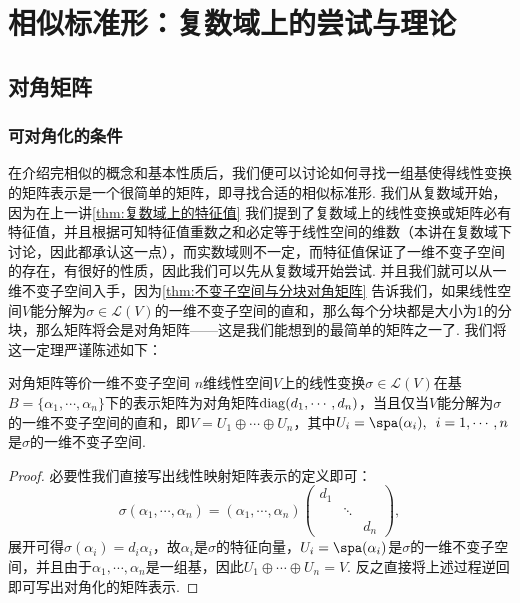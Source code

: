 \chapter{相似标准形：复数域上的尝试与理论}

\section{对角矩阵}
\subsection{可对角化的条件}

在介绍完相似的概念和基本性质后，我们便可以讨论如何寻找一组基使得线性变换的矩阵表示是一个很简单的矩阵，即寻找合适的相似标准形. 我们从复数域开始，因为在上一讲\autoref{thm:复数域上的特征值} 我们提到了复数域上的线性变换或矩阵必有特征值，并且根据可知特征值重数之和必定等于线性空间的维数（本讲在复数域下讨论，因此都承认这一点），而实数域则不一定，而特征值保证了一维不变子空间的存在，有很好的性质，因此我们可以先从复数域开始尝试. 并且我们就可以从一维不变子空间入手，因为\autoref{thm:不变子空间与分块对角矩阵} 告诉我们，如果线性空间$V$能分解为$\sigma\in\mathcal{L}(V)$的一维不变子空间的直和，那么每个分块都是大小为1的分块，那么矩阵将会是对角矩阵——这是我们能想到的最简单的矩阵之一了. 我们将这一定理严谨陈述如下：
\begin{theorem}{}{对角矩阵等价一维不变子空间}
    $n$维线性空间$V$上的线性变换$\sigma\in\mathcal{L}(V)$在基$B=\{\alpha_1,\cdots,\alpha_n\}$下的表示矩阵为对角矩阵$\operatorname{diag}(d_1,\cdots,d_n)$，当且仅当$V$能分解为$\sigma$的一维不变子空间的直和，即$V=U_1\oplus\cdots\oplus U_n$，其中$U_i=\spa(\alpha_i),\enspace i=1,\cdots,n$是$\sigma$的一维不变子空间.
\end{theorem}
\begin{proof}
    必要性我们直接写出线性映射矩阵表示的定义即可：
    \[\sigma(\alpha_1,\cdots,\alpha_n)=(\alpha_1,\cdots,\alpha_n)\begin{pmatrix}
            d_1 &        &     \\
                & \ddots &     \\
                &        & d_n
        \end{pmatrix},\]
    展开可得$\sigma(\alpha_i)=d_i\alpha_i$，故$\alpha_i$是$\sigma$的特征向量，$U_i=\spa(\alpha_i)$是$\sigma$的一维不变子空间，并且由于$\alpha_1,\cdots,\alpha_n$是一组基，因此$U_1\oplus\cdots\oplus U_n=V$. 反之直接将上述过程逆回即可写出对角化的矩阵表示.
\end{proof}

